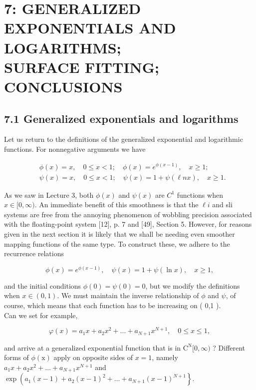 \documentclass[10pt]{article}
\begin{document}
\section*{7: GENERALIZED EXPONENTIALS AND LOGARITHMS; \\
 SURFACE FITTING; CONCLUSIONS }


\subsection*{7.1 Generalized exponentials and logarithms}
Let us return to the definitions of the generalized exponential and logarithmic functions. For nonnegative arguments we have

$$
\begin{aligned}
& \phi(x)=x, \quad 0 \leqslant x<1 ; \quad \phi(x)=e^{\phi(x-1)}, \quad x \geqslant 1 ; \\
& \psi(x)=x, \quad 0 \leqslant x<1 ; \quad \psi(x)=1+\psi(\ell n x), \quad x \geqslant 1 .
\end{aligned}
$$

As we saw in Lecture 3, both $\phi(x)$ and $\psi(x)$ are $C^{1}$ functions when $x \in[0, \infty)$. An immediate benefit of this smoothness is that the $\ell i$ and sli systems are free from the annoying phenomenon of wobbling precision associated with the floating-point system [12], p. 7 and [49], Section 5. However, for reasons given in the next section it is likely that we shall be needing even smoother mapping functions of the same type. To construct these, we adhere to the recurrence relations

$$
\phi(x)=e^{\phi(x-1)}, \quad \psi(x)=1+\psi(\ln x), \quad x \geqslant 1,
$$

and the initial conditions $\phi(0)=\psi(0)=0$, but we modify the definitions when $x \in(0,1)$. We must maintain the inverse relationship of $\phi$ and $\psi$, of course, which means that each function has to be increasing on ( 0,1 ).\\
Can we set for example,

$$
\varphi(x)=a_{1} x+a_{2} x^{2}+\ldots+a_{N+1} x^{N+1}, \quad 0 \leqslant x \leqslant 1,
$$

and arrive at a generalized exponential function that is in $\mathrm{C}^{\mathrm{N}}[0, \infty)$ ? Different forms of $\phi(\mathrm{x})$ apply on opposite sides of $x=1$, namely\\
$a_{1} x+a_{2} x^{2}+\ldots+a_{N+1} x^{N+1}$ and $\exp \left(a_{1}(x-1)+a_{2}(x-1)^{2}+\ldots+a_{N+1}(x-1)^{N+1}\right\}$.
\end{document}
